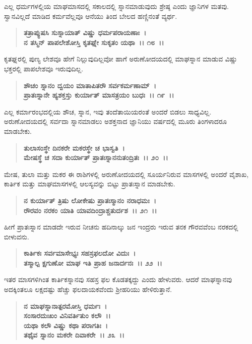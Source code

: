 ಎಲ್ಲ ಧರ್ಮಗಳಲ್ಲಿಯ ಮಾಘಮಾಸದಲ್ಲಿ ಸಕಾಲದಲ್ಲಿ ಸ್ನಾನಮಾಡುವುದು ಶ್ರೇಷ್ಠ ಎಂದು ಜ್ಞಾನಿಗಳ ಮತವು. ಸ್ವಾನವಿಲ್ಲದೆ ಮಾಡಿದ ಕರ್ಮವೆಲ್ಲವೂ ಆನೆಯು ತಿಂದ ಬೇಲದ ಹಣ್ಣಿನಂತೆ ವ್ಯರ್ಥ.

\begin{verse}
\textbf{ತತ್ರಾಪ್ಯುಷಸಿ ಸುಸ್ನಾಯಾತ್ ವಿಷ್ಣು ಧರ್ಮಪರಾಯಣಾಃ~।}\\\textbf{ನ ತಸ್ಮಿನ್ ಪಾಪಲೇಶೋಸ್ತಿ ಕೃತಘ್ನೇ ಸುಕೃತಂ ಯಥಾ~।। ೧೮~।।}
\end{verse}

ಕೃತಘ್ನರಲ್ಲಿ ಪುಣ್ಯ ಲೇಶವೂ ಹೇಗೆ ನಿಲ್ಲುವುದಿಲ್ಲವೋ ಹಾಗೆ ಅರುಣೋದಯದಲ್ಲಿ ಮಾಘಸ್ನಾನ ಮಾಡುವ ವಿಷ್ಣು ಭಕ್ತರಲ್ಲಿ ಪಾಪಲೇಶವೂ ಇರುವುದಿಲ್ಲ.

\begin{verse}
\textbf{ಶೌಚಂ ಸ್ನಾನಂ ದ್ವಯಂ ಮಾತಾಪಿತರೌ ಸರ್ವಕರ್ಮಣಾಮ್~।}\\\textbf{ಪ್ರಾತಃಸ್ನಾನೇ ಹ್ಯಶಕ್ತಸ್ತು ಕುರ್ಯಾತ್ ಮಾಸತ್ರಯಂ ಬುಧಃ~।। ೧೯~।।}
\end{verse}

ಎಲ್ಲ ಕರ್ಮಾರಂಭದಲ್ಲಿಯ ಶೌಚ, ಸ್ನಾನ, ಇವು ತಂದೆತಾಯಿಯರಂತೆ ಅಂದರೆ ಬಿಡಲು ಸಾಧ್ಯವಿಲ್ಲ. ಅರುಣೋದಯದಲ್ಲಿ ಸರ್ವದಾ ಸ್ನಾನಮಾಡಲು ಅಶಕ್ತನಾದ ಜ್ಞಾನಿಯು ವರ್ಷದಲ್ಲಿ ಮೂರು ತಿಂಗಳಾದರೂ ಮಾಡಬೇಕು.

\begin{verse}
\textbf{ತುಲಾಸಂಸ್ಥೇ ದಿನಕರೇ ಮಕರಸ್ಥೇ ಚ ಭಾಸ್ವತಿ~।}\\\textbf{ಮೇಷಸ್ಥೆ ಚ ಸದಾ ಕುರ್ಯಾತ್ ಪ್ರಾತಃಸ್ನಾನನುತಂದ್ರಿತಃ~।। ೨೦~।।}
\end{verse}

ಮೇಷ, ತುಲಾ ಮತ್ತು ಮಕರ ಈ ರಾಶಿಗಳಲ್ಲಿ ಅರುಣೋದಯದಲ್ಲಿ ಸೂರ್ಯನಿರುವ ಮಾಸಗಳಲ್ಲಿ ಅಂದರೆ ವೈಶಾಖ, ಕಾರ್ತಿಕ ಮತ್ತು ಮಾಘಮಾಸಗಳಲ್ಲಿ ಆಲಸ್ಯವನ್ನು ಬಿಟ್ಟು ಪ್ರಾತಃಸ್ನಾನ ಮಾಡಬೇಕು.

\begin{verse}
\textbf{ನ ಕುರ್ಯಾತ್ ತ್ರಿಷು ಲೋಕೇಷು ಪ್ರಾತಃಸ್ಮಾನಂ ನರಾಧಮಃ~।}\\\textbf{ರೌರವಂ ನರಕಂ ಯಾತಿ ಯಾವದಿಂದ್ರಾಶ್ಚತುರ್ದಶ~।। ೨೧~।।}
\end{verse}

ಹೀಗೆ ಪ್ರಾತಃಸ್ನಾನ ಮಾಡದೇ ಇರುವ ನೀಚನು ಹದಿನಾಲ್ಕು ಜನ ಇಂದ್ರರು ಇರುವ ತನಕ ಗೌರವವೆಂಬ ನರಕದಲ್ಲಿ ಬೀಳುವನು.

\begin{verse}
\textbf{ಕಾರ್ತಿಕಃ ಸರ್ವಮಾಸೇಭ್ಯಃ ಸಹಸ್ರಫಲದೋ ವಿದುಃ~।}\\\textbf{ತಸ್ಮಾಲ್ಪ ಕ್ಷಗುಣೋ ಮಾಘ ಇತಿ ಪ್ರಾಹ ಜನಾರ್ದನಃ~।। ೨೨~।।}
\end{verse}

ಇತರ ಮಾಸಗಳಿಗಿಂತ ಕಾರ್ತಿಕಸ್ನಾನವು ಸಹಸ್ರ ಫಲ ಕೊಡತಕ್ಕದ್ದು ಎಂದು ಹೇಳುವರು. ಆದರೆ ಮಾಘಸ್ನಾನವು ಅದಕ್ಕಿಂತಲೂ ಲಕ್ಷದಷ್ಟು ಹೆಚ್ಚು ಫಲದಾಯಕವೆಂದು ಶ‍್ರೀಹರಿಯು ಹೇಳಿರುತ್ತಾನೆ.

\begin{verse}
\textbf{ನ ಮಾಘಸ್ನಾನಾತ್ಪರಮೋಸ್ತಿ ಧರ್ಮಃ~।}\\\textbf{ಸಂಸಾರದುಃಖಂ ವಿನಿವರ್ತಿತುಂ ಕಲೌ~।।}\\\textbf{ಯಥಾ ಕಲೌ ವಿಷ್ಣು ಕಥಾ ಪರಾಗತಿಃ~।}\\\textbf{ತಥೈವ ಸ್ನಾನಂ ಮಕರೇ ದಿವಾಕರೇ~।। ೨೩~।।}
\end{verse}

